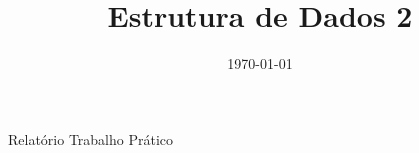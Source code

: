 \documentclass[12pt]{article}
\begin{document}
\title{Estrutura de Dados 2}
\date{\today}

\maketitle

\vspace{40pt}

\begin{center}
Relatório Trabalho Prático
\end{center}

\vspace{80pt}


\newpage


\newpage



\end{document}
